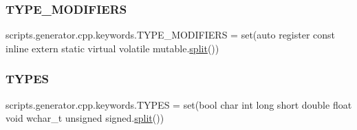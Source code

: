 \subsubsection{\texorpdfstring{TYPE\_MODIFIERS}{TYPE\_MODIFIERS}}
{\footnotesize\ttfamily scripts.\+generator.\+cpp.\+keywords.\+T\+Y\+P\+E\+\_\+\+M\+O\+D\+I\+F\+I\+E\+RS = set(\textquotesingle{}auto register const inline extern static virtual volatile mutable\textquotesingle{}.\mbox{\hyperlink{_input_8h_aec2fd8cd9140a1b535dc54a924396f40}{split}}())}

\mbox{\label{namespacescripts_1_1generator_1_1cpp_1_1keywords_accb4fe6c0a64f9e93316936fd7f06dda}} 
\subsubsection{\texorpdfstring{TYPES}{TYPES}}
{\footnotesize\ttfamily scripts.\+generator.\+cpp.\+keywords.\+T\+Y\+P\+ES = set(\textquotesingle{}bool char int long short double float void wchar\+\_\+t unsigned signed\textquotesingle{}.\mbox{\hyperlink{_input_8h_aec2fd8cd9140a1b535dc54a924396f40}{split}}())}

